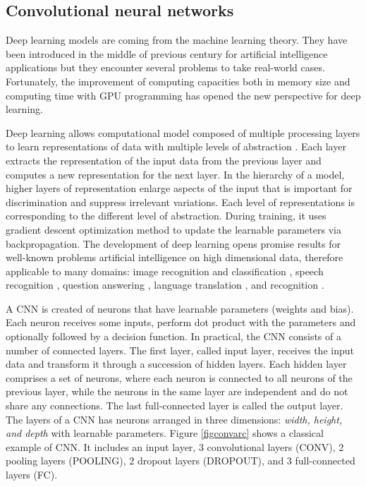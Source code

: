 \documentclass{article} %
\begin{document}
\begin{multicols}{2}
\section{Convolutional neural networks}
Deep learning models are coming from the machine learning theory. They have been introduced in the middle of previous century for artificial intelligence applications but they encounter several problems to take real-world cases. Fortunately, the improvement of computing capacities both in memory size and computing time with GPU programming has opened the new perspective for deep learning. 

Deep learning allows computational model composed of multiple processing layers to learn representations of data with multiple levels of abstraction \cite{lecun2015deep}. Each layer extracts the representation of the input data from the previous layer and computes a new representation for the next layer. In the hierarchy of a model, higher layers of representation enlarge aspects of the input that is important for discrimination and suppress irrelevant variations. Each level of representations is corresponding to the different level of abstraction. During training, it uses gradient descent optimization method to update the learnable parameters via backpropagation. The development of deep learning opens promise results for well-known problems artificial intelligence on high dimensional data, therefore applicable to many domains: image recognition and classification \cite{krizhevsky2012imagenet,ciregan2012multi,szegedy2015going}, speech recognition \cite{mikolov2011strategies,hinton2012deep,sainath2013deep}, question answering \cite{bordes2014question}, language translation \cite{sutskever2014sequence, jean2014using}, and recognition \cite{li2015convolutional, tompson2014joint}.

A CNN is created of neurons that have learnable parameters (weights and bias). Each neuron receives some inputs, perform dot product with the parameters and optionally followed by a decision function. In practical, the CNN consists of a number of connected layers. The first layer, called input layer, receives the input data and transform it through a succession of hidden layers. Each hidden layer comprises a set of neurons, where each neuron is connected to all neurons of the previous layer, while the neurons in the same layer are independent and do not share any connections. The last full-connected layer is called the output layer. The layers of a CNN has neurons arranged in three dimensions: \textit{width, height, and depth} with learnable parameters. Figure \ref{figconvarc} shows a classical example of CNN. It includes an input layer, $3$ convolutional layers (CONV), $2$ pooling layers (POOLING), $2$ dropout layers (DROPOUT), and $3$ full-connected layers (FC).


\end{multicols}
\end{document}
